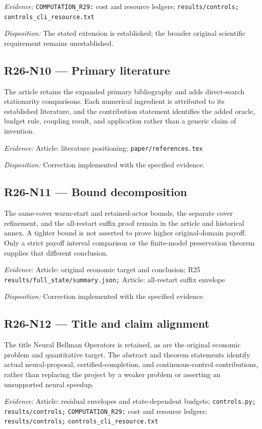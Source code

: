 \emph{Evidence:} \nolinkurl{COMPUTATION_R29:} cost and resource ledgers; \nolinkurl{results/controls;} \nolinkurl{controls_cli_resource.txt}

\emph{Disposition:} The stated extension is established; the broader original scientific requirement remains unestablished.
\subsection{R26-N10 --- Primary literature}
The article retains the expanded primary bibliography and adds direct-search stationarity comparisons. Each numerical ingredient is attributed to its established literature, and the contribution statement identifies the added oracle, budget rule, coupling result, and application rather than a generic claim of invention.

\emph{Evidence:} Article: literature positioning; \nolinkurl{paper/references.tex}

\emph{Disposition:} Correction implemented with the specified evidence.
\subsection{R26-N11 --- Bound decomposition}
The same-cover warm-start and retained-actor bounds, the separate cover refinement, and the all-restart suffix proof remain in the article and historical annex. A tighter bound is not asserted to prove higher original-domain payoff. Only a strict payoff interval comparison or the finite-model preservation theorem supplies that different conclusion.

\emph{Evidence:} Article: original economic target and conclusion; R25 \nolinkurl{results/full_state/summary.json;} Article: all-restart suffix envelope

\emph{Disposition:} Correction implemented with the specified evidence.
\subsection{R26-N12 --- Title and claim alignment}
The title Neural Bellman Operators is retained, as are the original economic problem and quantitative target. The abstract and theorem statements identify actual neural-proposal, certified-completion, and continuous-control contributions, rather than replacing the project by a weaker problem or asserting an unsupported neural speedup.

\emph{Evidence:} Article: residual envelopes and state-dependent budgets; \nolinkurl{controls.py;} \nolinkurl{results/controls;} \nolinkurl{COMPUTATION_R29:} cost and resource ledgers; \nolinkurl{results/controls;} \nolinkurl{controls_cli_resource.txt}

